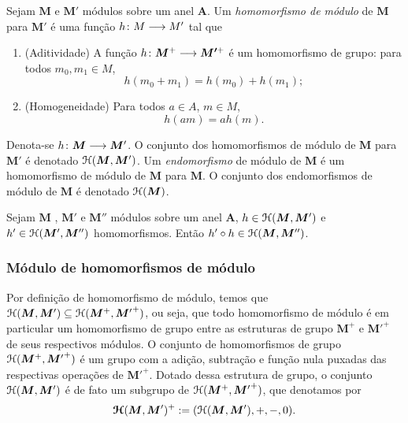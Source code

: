 \begin{definition}
Sejam $\bm M$ e $\bm M'$ módulos sobre um anel $\bm A$. Um \emph{homomorfismo de módulo} de $\bm M$ para $\bm M'$ é uma função ${h}\colon {M} \longrightarrow {M'}$ tal que
	\begin{enumerate}
	\item (Aditividade) A função ${h}\colon {\bm M^+} \longrightarrow {\bm {M'}^+}$ é um homomorfismo de grupo: para todos $m_0,m_1 \in M$,
		\begin{equation*}
		h(m_0 + m_1) = h(m_0) + h(m_1);
		\end{equation*}
	
	\item (Homogeneidade) %
	Para todos $a \in A$, $m \in M$,
		\begin{equation*}
		h(a m) = a h(m).
		\end{equation*}
	\end{enumerate}
Denota-se ${h}\colon {\bm M} \longrightarrow {\bm M'}$. O conjunto dos homomorfismos de módulo de $\bm M$ para $\bm M'$ é denotado $\mathcal{H}(\bm M, \bm M')$. Um \emph{endomorfismo} de módulo de $\bm M$ é um homomorfismo de módulo de $\bm M$ para $\bm M$. O conjunto dos endomorfismos de módulo de $\bm M$ é denotado $\mathcal{H}(\bm M)$.
\end{definition}

\begin{exercise}
Sejam $\bm M$ , $\bm M'$ e $\bm M''$ módulos sobre um anel $\bm A$, $h \in \mathcal{H}(\bm M, \bm M')$ e $h' \in \mathcal{H}(\bm M', \bm M'')$ homomorfismos. Então $h' \circ h \in  \mathcal{H}(\bm M, \bm M'')$.
\end{exercise}

\subsubsection{Módulo de homomorfismos de módulo}

Por definição de homomorfismo de módulo, temos que $\mathcal{H}(\bm M,\bm M') \subseteq \mathcal{H}(\bm M^+,{\bm M'}^+)$, ou seja, que todo homomorfismo de módulo é em particular um homomorfismo de grupo entre as estruturas de grupo $\bm M^+$ e ${\bm M'}^+$ de seus respectivos módulos. O conjunto de homomorfismos de grupo $\mathcal{H}(\bm M^+,{\bm M'}^+)$ é um grupo com a adição, subtração e função nula puxadas das respectivas operações de ${\bm M'}^+$. Dotado dessa estrutura de grupo, o conjunto $\mathcal{H}(\bm M,\bm M')$ é de fato um subgrupo de $\mathcal{H}(\bm M^+,{\bm M'}^+)$, que denotamos por
	\begin{equation*}
	\bm{\mathcal{H}}(\bm M,\bm M')^+ := (\mathcal{H}(\bm M,\bm M'),+,-,0).
	\end{equation*}

